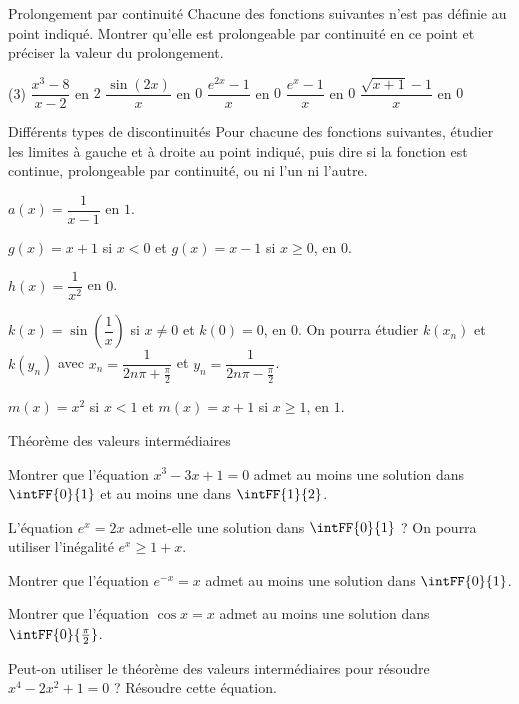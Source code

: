 \begin{exercice}[2]{Prolongement par continuité}
Chacune des fonctions suivantes n'est pas définie au point indiqué. Montrer qu'elle est prolongeable par continuité
en ce point et préciser la valeur du prolongement.
\begin{tasks}(3)
  \task $\dfrac{x^{3}-8}{x-2}$ en $2$
  \task $\dfrac{\sin(2x)}{x}$ en $0$
  \task $\dfrac{e^{2x}-1}{x}$ en $0$
  \task $\dfrac{e^{x}-1}{x}$ en $0$
  \task $\dfrac{\sqrt{x+1}-1}{x}$ en $0$
\end{tasks}
\end{exercice}

\begin{exercice}[2]{Différents types de discontinuités}
Pour chacune des fonctions suivantes, étudier les limites à gauche et à droite au point indiqué, puis dire si la fonction
est continue, prolongeable par continuité, ou ni l'un ni l'autre.
\begin{questions}
  \item $a(x)=\dfrac{1}{x-1}$ en $1$.
  \item $g(x)=x+1$ si $x<0$ et $g(x)=x-1$ si $x\geq0$, en $0$.
  \item $h(x)=\dfrac{1}{x^{2}}$ en $0$.
  \item $k(x)=\sin\left(\dfrac1x\right)$ si $x\neq0$ et $k(0)=0$, en $0$. On pourra étudier $k(x_n)$ et $k(y_n)$ avec
    $x_n=\dfrac{1}{2n\pi+\frac{\pi}{2}}$ et $y_n=\dfrac{1}{2n\pi-\frac{\pi}{2}}$.
  \item $m(x)=x^{2}$ si $x<1$ et $m(x)=x+1$ si $x\geq1$, en $1$.
\end{questions}
\end{exercice}

\begin{exercice}[2]{Théorème des valeurs intermédiaires}
\begin{questions}
  \item Montrer que l'équation $x^{3}-3x+1=0$ admet au moins une solution dans $\intFF{0}{1}$ et au moins une dans $\intFF{1}{2}$.
  \item L'équation $e^{x}=2x$ admet-elle une solution dans $\intFF{0}{1}$ ? On pourra utiliser l'inégalité $e^{x}\geq1+x$.
  \item Montrer que l'équation $e^{-x}=x$ admet au moins une solution dans $\intFF{0}{1}$.
  \item Montrer que l'équation $\cos x=x$ admet au moins une solution dans $\intFF{0}{\frac{\pi}{2}}$.
  \item Peut-on utiliser le théorème des valeurs intermédiaires pour résoudre $x^{4}-2x^{2}+1=0$ ? Résoudre cette équation.
\end{questions}
\end{exercice}

